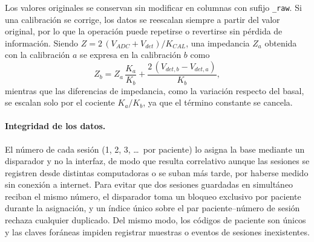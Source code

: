 Los valores originales se conservan sin modificar en columnas con sufijo \texttt{\_raw}. Si una calibración se corrige, los datos se reescalan siempre a partir del valor original, por lo que la operación puede repetirse o revertirse sin pérdida de información. Siendo $Z = 2\,(V_{ADC} + V_{det})/K_{CAL}$, una impedancia $Z_a$ obtenida con la calibración $a$ se expresa en la calibración $b$ como
\begin{equation}
    Z_b = Z_a\,\frac{K_a}{K_b} + \frac{2\,(V_{det,b} - V_{det,a})}{K_b},
    \label{eq:reescalado}
\end{equation}
mientras que las diferencias de impedancia, como la variación respecto del basal, se escalan solo por el cociente $K_a/K_b$, ya que el término constante se cancela.

\paragraph{Integridad de los datos.} El número de cada sesión (1, 2, 3, \dots\ por paciente) lo asigna la base mediante un disparador y no la interfaz, de modo que resulta correlativo aunque las sesiones se registren desde distintas computadoras o se suban más tarde, por haberse medido sin conexión a internet. Para evitar que dos sesiones guardadas en simultáneo reciban el mismo número, el disparador toma un bloqueo exclusivo por paciente durante la asignación, y un índice único sobre el par paciente--número de sesión rechaza cualquier duplicado. Del mismo modo, los códigos de paciente son únicos y las claves foráneas impiden registrar muestras o eventos de sesiones inexistentes.

